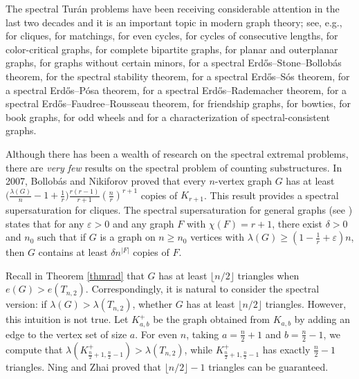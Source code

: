 \documentclass[11pt]{article}
\begin{document}
\medskip 
The spectral Tur\'{a}n problems have been receiving considerable 
attention in the last two decades 
and it is an important topic in modern graph theory; see, e.g., 
\cite{Niki2002cpc,BN2007jctb,LP2022second} for cliques, 
\cite{FYZ07}  for matchings, 
\cite{CDT2023-even-cycle} for even cycles,  
\cite{LN2023,Zhang2024,LZS2024} for cycles of consecutive lengths, 
\cite{Niki2009ejc} for color-critical graphs, 
\cite{BG2009,Niki2010laa} for complete bipartite graphs, 
\cite{TT2017,LN2021outplanar} for planar and 
outerplanar graphs, 
\cite{Tait2019,ZL2022jctb,CLZ2024,ZFL2024} for graphs without certain minors, 
\cite{Niki2009cpc} for a spectral Erd\H{o}s--Stone--Bollob\'{a}s theorem,  
\cite{Niki2009jgt} for the spectral stability theorem, 
\cite{CDT2023} for a spectral Erd\H{o}s--S\'{o}s theorem, 
\cite{ZL2022} for a spectral Erd\H{o}s--P\'{o}sa theorem, 
\cite{LLP2024-AAM} for a spectral Erd\H{o}s--Rademacher theorem, 
\cite{LFP2024-triangular} for a spectral Erd\H{o}s--Faudree--Rousseau theorem, 
\cite{CFTZ20,ZLX2022,LFP2024-triangular} for friendship graphs, 
\cite{2022LLP, LFP-count-bowtie} for bowties, 
\cite{ZL2022jgt,Niki2021} for book graphs, 
\cite{CDT2022} for odd wheels  
and \cite{Wang2022,FTZ2024} for a characterization of spectral-consistent graphs. 

\medskip 
Although there has been a wealth of research 
on the spectral extremal problems, 
there are \textit{very few} results on the spectral problem  
of counting substructures. 
In 2007, Bollob\'{a}s 
and Nikiforov \cite{BN2007jctb} proved that every $n$-vertex graph $G$ has at least 
$\big( \frac{\lambda (G)}{n} - 1 + \frac{1}{r} \big) 
\frac{r(r-1)}{r+1} ( \frac{n}{r})^{r+1}$ copies of $K_{r+1}$. 
This result provides a spectral supersaturation for cliques. 
The spectral supersaturation for general graphs (see \cite[Sec. 5]{LLP2024-AAM}) states that  
for any $\varepsilon >0$ and any graph $F$ with $\chi (F)=r+1$, there exist $\delta>0$ and $n_0$ such that if $G$ is a graph on $n\ge n_0$ vertices with  $ \lambda (G)\ge \left(1- \frac{1}{r} + \varepsilon \right)n$, 
 then $G$ contains at least $\delta n^{|F|}$ copies of $F$. 

\medskip 
Recall in Theorem \ref{thmrad} that $G$ has at least 
$ \lfloor {n}/{2} \rfloor$ triangles when $e(G) > e(T_{n,2})$.  Correspondingly, 
it is natural to consider the  spectral version:  
if $ \lambda (G)> \lambda (T_{n,2})$, 
whether $G$ has at least  $\lfloor {n}/{2}\rfloor$ triangles.   
However, this intuition is not true. 
Let $K_{a,b}^+$ be the graph obtained from $K_{a,b}$ by adding an edge to 
the vertex set of size $a$. 
For even $n$, taking $a=\frac{n}{2} +1$ and $b=\frac{n}{2}-1$,  
we compute that $\lambda (K_{\frac{n}{2}+1,\frac{n}{2}-1}^+) > \lambda (T_{n,2})$,   while  $K_{\frac{n}{2}+1,\frac{n}{2}-1}^+$ has exactly $\frac{n}{2}-1$ triangles.   
Ning and Zhai \cite{NZ2021} proved that 
$\lfloor {n}/{2}\rfloor -1 $ triangles can be guaranteed. 
\end{document}
